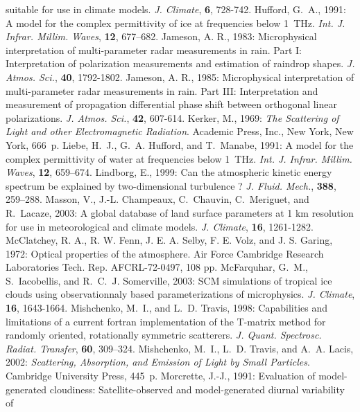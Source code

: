    suitable for use in climate models. {\it J. Climate}, {\bf 6}, 728-742.
\decrefname
Hufford, G.~A., 1991: A model for the complex permittivity of ice at
  frequencies below 1~{THz}. {\em Int. J. Infrar. Millim. Waves}, {\bf 12},
  677--682.
\decrefname
Jameson, A. R., 1983:
      Microphysical interpretation of multi-parameter radar measurements in
      rain. Part I: Interpretation of polarization measurements and estimation
      of raindrop shapes.
      {\it J. Atmos. Sci.},
      {\bf 40},
      1792-1802.
\decrefname
Jameson, A. R., 1985:
      Microphysical interpretation of multi-parameter radar measurements in
      rain. Part III: Interpretation and measurement of propagation 
      differential phase shift between orthogonal linear polarizations.
      {\it J. Atmos. Sci.},
      {\bf 42},
      607-614.
\decrefname
Kerker, M., 1969: {\em The Scattering of Light and other Electromagnetic
  Radiation}. Academic Press, Inc., New York, New York, 666~p.
\decrefname
Liebe, H.~J., G.~A. Hufford, and T.~Manabe, 1991: A model for the complex
  permittivity of water at frequencies below 1~{THz}. {\em Int. J. Infrar.
  Millim. Waves}, {\bf 12}, 659--674.
\decrefname
Lindborg, E., 1999: Can the atmospheric kinetic energy spectrum be explained
  by two-dimensional turbulence ? {\em J. Fluid. Mech.}, {\bf 388},
  259--288.
\decrefname
Masson, V., J.-L. Champeaux, C.~Chauvin, C.~Meriguet, and R.~Lacaze, 2003:
  A global database of land surface parameters at 1 km resolution for use in
  meteorological and climate models. {\it J. Climate}, {\bf 16}, 1261-1282.
\decrefname
McClatchey, R. A., R. W. Fenn, J. E. A. Selby, F. E. Volz, and J. S.
  Garing, 1972: Optical properties of the atmosphere. Air Force
  Cambridge Research Laboratories Tech. Rep. AFCRL-72-0497, 108 pp.
\decrefname
McFarquhar, G.~M., S.~Iacobellis, and R.~C.~J. Somerville, 2003: 
  SCM simulations of tropical ice clouds using observationnaly based
  parameterizations of microphysics. {\it J. Climate}, {\bf 16}, 1643-1664.
\decrefname
Mishchenko, M.~I., and L.~D. Travis, 1998: Capabilities and limitations of a
  current {\sc fortran} implementation of the {T}-matrix method for randomly
  oriented, rotationally symmetric scatterers. {\em J. Quant. Spectrosc.
  Radiat. Transfer}, {\bf 60}, 309--324.
\decrefname
Mishchenko, M.~I., L.~D. Travis, and A.~A. Lacis, 2002: {\em Scattering, Absorption, and
  Emission of Light by Small Particles}. Cambridge University Press, 445~p.
\decrefname
Morcrette, J.-J., 1991: Evaluation of model-generated cloudiness: 
Satellite-observed and model-generated diurnal variability of
